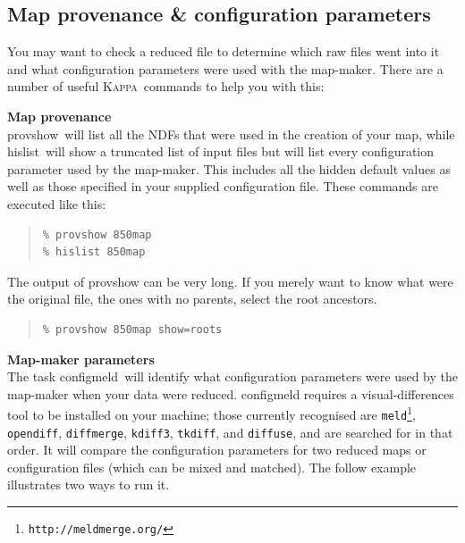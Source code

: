 \documentclass[twoside,11pt]{article}
\newcommand{\htmladdnormallink}[2]{#1}
\newcommand{\latex}[1]{#1}
\newcommand{\xref}[3]{#1}
\newcommand{\xlabel}[1]{}
\renewcommand{\_}{\texttt{\symbol{95}}}
\newenvironment{myquote}{
   \color{MidnightBlue}\begin{quote}\begin{small}}{
   \end{small}\end{quote}
}
\newcommand{\Kappa}{\xref{\textsc{Kappa}}{sun95}{}}
\newcommand{\task}[1]{\textsf{#1}}
\newcommand{\url}[1]{\texttt{#1}}
\newcommand{\configmeld}{\xref{\task{configmeld}}{sun258}{CONFIGMELD}}
\newcommand{\hislist}{\xref{\task{hislist}}{sun95}{HISLIST}}
\newcommand{\provshow}{\xref{\task{provshow}}{sun95}{PROVSHOW}}
\renewenvironment{myquote}{
      \begin{quote}\begin{small}}{
      \end{small}\end{quote}
   }
\begin{document}
\subsection{\xlabel{provenance}Map provenance \& configuration parameters}
\label{sec:prov}

You may want to check a reduced file to determine which raw files went
into it and what configuration parameters were used with the
map-maker. There are a number of useful \Kappa\ commands to help you
with this:

\textbf{Map provenance}\\
\provshow\ will list all the NDFs that were used in the creation of
your map, while \hislist\ will show a truncated list of input files
but will list every configuration parameter used by the map-maker.
This includes all the hidden default values as well as those specified
in your supplied configuration file. These commands are executed like
this:
\begin{myquote}
\begin{verbatim}
% provshow 850map
% hislist 850map
\end{verbatim}
\end{myquote}

The output of \task{provshow} can be very long.  If you merely want to
know what were the original file, the ones with no parents, select
the root ancestors.

\begin{myquote}
\begin{verbatim}
% provshow 850map show=roots
\end{verbatim}
\end{myquote}


\textbf{Map-maker parameters}\\
The task \configmeld\ will identify what configuration parameters were
used by the map-maker when your data were reduced. \task{configmeld}
requires a visual-differences tool to be installed on your machine;
those currently recognised are
\htmladdnormallink{\texttt{meld}}{http://meldmerge.org/}\latex{\footnote{\url{http://meldmerge.org/}}},
\htmladdnormallink{\texttt{opendiff}}{http://developer.apple.com/},
\htmladdnormallink{\texttt{diffmerge}}{http://www.sourcegear.com/diffmerge},
\htmladdnormallink{\texttt{kdiff3}}{http://kdiff3.sourceforge.net},
\htmladdnormallink{\texttt{tkdiff}}{http://sourceforge.net/projects/tkdiff}, and
\htmladdnormallink{\texttt{diffuse}}{http://diffuse.sourceforge.net},
and are searched for in that order. It will compare the
configuration parameters for two reduced maps or configuration files
(which can be mixed and matched). The follow example illustrates two
ways to run it.
\end{document}
